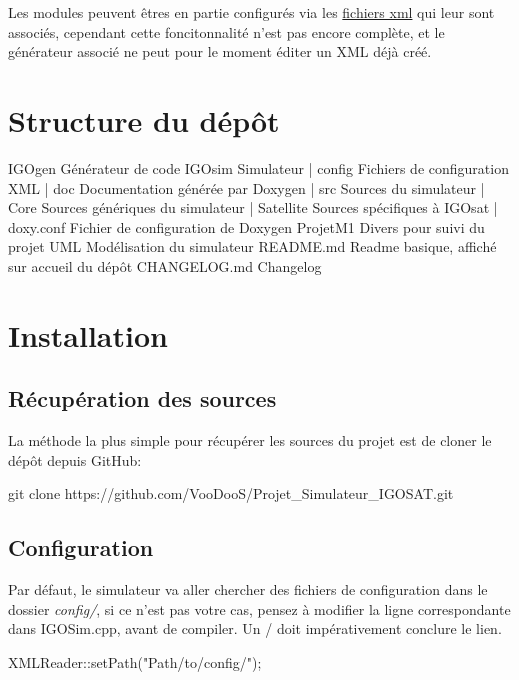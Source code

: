 Les modules peuvent êtres en partie configurés via les \hyperlink{xmlRef}{fichiers xml} qui leur sont associés, cependant cette foncitonnalité n'est pas encore complète, et le générateur associé ne peut pour le moment éditer un X\-M\-L déjà créé.\hypertarget{index_struc}{}\section{Structure du dépôt}\label{index_struc}
\begin{DoxyVerb}IGOgen                         Générateur de code
IGOsim                         Simulateur
   | config                    Fichiers de configuration XML
   | doc                       Documentation générée par Doxygen
   | src                       Sources du simulateur
       | Core                  Sources génériques du simulateur
       | Satellite                 Sources spécifiques à IGOsat
   | doxy.conf                 Fichier de configuration de Doxygen
ProjetM1                       Divers pour suivi du projet
UML                            Modélisation du simulateur
README.md                      Readme basique, affiché sur accueil du dépôt
CHANGELOG.md                   Changelog
\end{DoxyVerb}
\hypertarget{index_install_sec}{}\section{Installation}\label{index_install_sec}
\hypertarget{index_tools_subsec}{}\subsection{Récupération des sources}\label{index_tools_subsec}
La méthode la plus simple pour récupérer les sources du projet est de cloner le dépôt depuis Git\-Hub\-: \begin{DoxyVerb}git clone https://github.com/VooDooS/Projet_Simulateur_IGOSAT.git
\end{DoxyVerb}
\hypertarget{index_tools_cofig}{}\subsection{Configuration}\label{index_tools_cofig}
Par défaut, le simulateur va aller chercher des fichiers de configuration dans le dossier {\itshape config/}, si ce n'est pas votre cas, pensez à modifier la ligne correspondante dans I\-G\-O\-Sim.\-cpp, avant de compiler. Un / doit impérativement conclure le lien. \begin{DoxyVerb}XMLReader::setPath("Path/to/config/");
\end{DoxyVerb}
